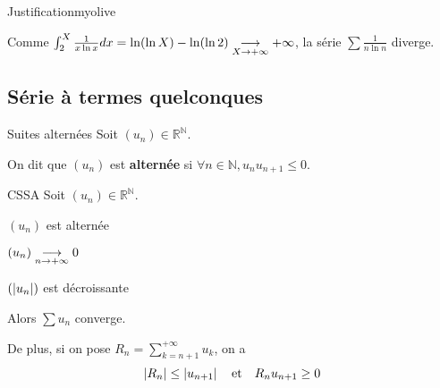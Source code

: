 \begin{demo}{Justification}{myolive}
\begin{itemize}
\begin{itemize}
                Comme $\int_{2}^{X} \frac{1}{x \ln x} dx = \ln( \ln X) - \ln(\ln 2) \underset{X \rightarrow +\infty}{\longrightarrow} + \infty$, la série $\sum \frac{1}{n \ln n}$ diverge.
            \end{itemize}
        \end{itemize}
    \end{demo}

\subsection{Série à termes quelconques}

    \begin{defi}{Suites alternées}{}
        Soit $(u_n) \in \mathbb{R}^{\mathbb{N}}$.

        On dit que $(u_n)$ est \textbf{alternée} si $\forall n \in \mathbb{N}, u_n u_{n+1} \leq 0$.
    \end{defi}

    \begin{theo}{CSSA}{}
        Soit $(u_n) \in \mathbb{R}^{\mathbb{N}}$. \begin{suppose}
            \item $(u_n)$ est alternée
            \item $(u_n) \underset{n \rightarrow +\infty}{\longrightarrow} 0$
            \item $(\left\lvert u_n\right\rvert)$ est décroissante
        \end{suppose}
        Alors $\sum u_n$ converge.

        De plus, si on pose $R_n = \sum_{k=n+1}^{+\infty} u_k$, on a 
        \[ \left\lvert R_n\right\rvert \leq \left\lvert u_{n+1}\right\rvert \quad \text{et} \quad R_n u_{n+1} \geq 0 \]
    \end{theo}

